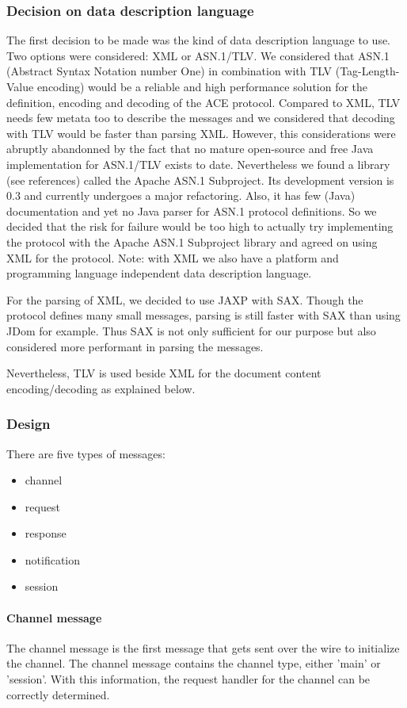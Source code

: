 \subsubsection{Decision on data description language}
The first decision to be made was the kind of data description language to use. Two options were considered: XML or ASN.1/TLV. We considered that ASN.1 (Abstract Syntax Notation number One) in combination with TLV (Tag-Length-Value encoding) would be a reliable and high performance solution for the definition, encoding and decoding of the ACE protocol. Compared to XML, TLV needs few metata too to describe the messages and we considered that decoding with TLV would be faster than parsing XML. However, this considerations were abruptly abandonned by the fact that no mature open-source and free Java implementation for ASN.1/TLV exists to date. Nevertheless we found a library (see references) called the Apache ASN.1 Subproject. Its development version is 0.3 and currently undergoes a major refactoring. Also, it has few (Java) documentation and yet no Java parser for ASN.1 protocol definitions. So we decided that the risk for failure would be too high to actually try implementing the protocol with the Apache ASN.1 Subproject library and agreed on using XML for the protocol. Note: with XML we also have a platform and programming language independent data description language.

For the parsing of XML, we decided to use JAXP with SAX. Though the protocol defines many small messages, parsing is still faster with SAX than using JDom for example. Thus SAX is not only sufficient for our purpose but also considered more performant in parsing the messages.

Nevertheless, TLV is used beside XML for the document content encoding/decoding as explained below.

\subsubsection{Design}
There are five types of messages:

\begin{itemize}
\item channel
\item request
\item response
\item notification
\item session
\end{itemize}

\paragraph{Channel message}
The channel message is the first message that gets sent over the wire to initialize the channel. The channel message contains the channel type, either 'main' or 'session'. With this information, the request handler for the channel can be correctly determined.

